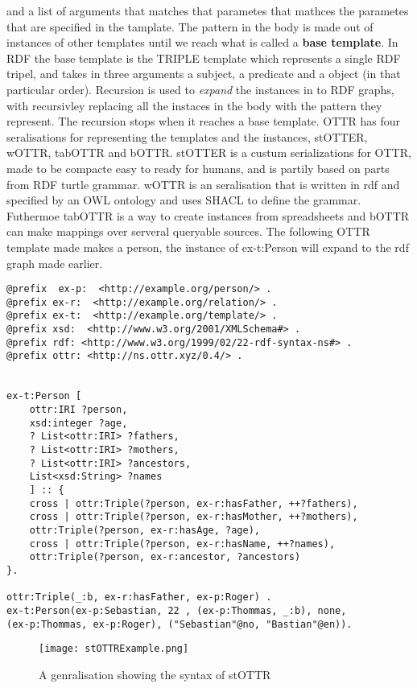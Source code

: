 and a list of arguments that matches that parametes that mathces the parametes that are specified in the tamplate. 
The pattern in the body is made out of instances of other templates until we reach what is called a \textbf{base template}. 
In RDF the base template is the TRIPLE template which represents a single RDF tripel, and takes in three arguments a subject,
a predicate and a object (in that particular order). Recursion is used to \textit{expand} the instances in to RDF graphs, with recursivley
replacing all the instaces in the body with the pattern they represent. The recursion stops when it reaches a base template.
OTTR has four seralisations for representing the templates and the instances, stOTTER, wOTTR, tabOTTR and bOTTR. stOTTER is a custum serializations
for OTTR, made to be compacte easy to ready for humans, and is partily based on parts from RDF turtle grammar.
wOTTR is an seralisation that is written in rdf and specified by an OWL ontology and uses SHACL to define the grammar. Futhermoe tabOTTR is
a way to create instances from spreadsheets and bOTTR can make mappings over serveral queryable sources. The following OTTR template 
made makes a person, the instance of ex-t:Person will expand to the rdf graph made earlier.

\begin{lstlisting}[frame=single]
@prefix  ex-p:  <http://example.org/person/> . 
@prefix ex-r:  <http://example.org/relation/> .
@prefix ex-t:  <http://example.org/template/> . 
@prefix xsd:  <http://www.w3.org/2001/XMLSchema#> . 
@prefix rdf: <http://www.w3.org/1999/02/22-rdf-syntax-ns#> .
@prefix ottr: <http://ns.ottr.xyz/0.4/> .


ex-t:Person [
    ottr:IRI ?person,
    xsd:integer ?age,
    ? List<ottr:IRI> ?fathers,
    ? List<ottr:IRI> ?mothers,
    ? List<ottr:IRI> ?ancestors,
    List<xsd:String> ?names
    ] :: {
    cross | ottr:Triple(?person, ex-r:hasFather, ++?fathers),
    cross | ottr:Triple(?person, ex-r:hasMother, ++?mothers),
    ottr:Triple(?person, ex-r:hasAge, ?age),
    cross | ottr:Triple(?person, ex-r:hasName, ++?names),
    ottr:Triple(?person, ex-r:ancestor, ?ancestors)
}.

ottr:Triple(_:b, ex-r:hasFather, ex-p:Roger) .
ex-t:Person(ex-p:Sebastian, 22 , (ex-p:Thommas, _:b), none, 
(ex-p:Thommas, ex-p:Roger), ("Sebastian"@no, "Bastian"@en)).
\end{lstlisting}

\begin{figure}
    \centering
    \texttt{[image: stOTTRExample.png]}
    \caption{A genralisation showing the syntax of stOTTR}
    \label{fig:stOTTERGenralisation}
\end{figure}

